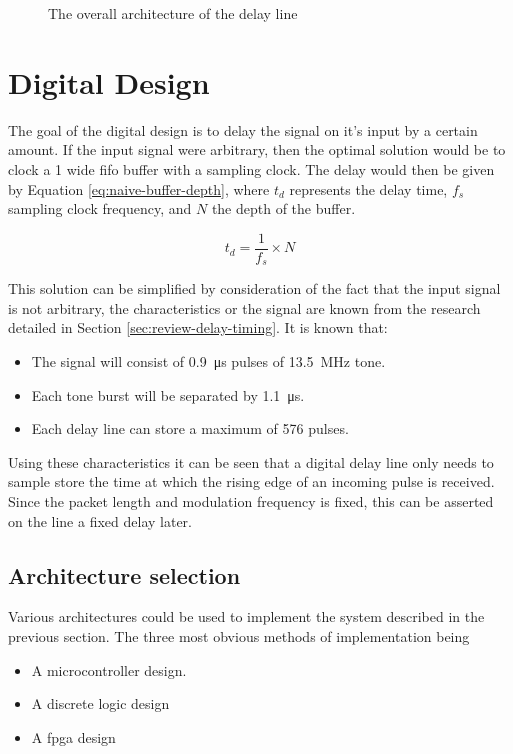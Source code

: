\begin{figure}[ht]
	\centering
	\dummyfigure
	\caption{The overall architecture of the delay line}
	\label{fig:delay-line-arch}
\end{figure}


\section{Digital Design} \label{sec:delay-line-dig-des}

The goal of the digital design is to delay the signal on it's input by a certain amount. If the input signal were arbitrary, then the optimal solution would be to clock a \SI{1}{\bit} wide \gls{fifo} buffer with a sampling clock. The delay would then be given by Equation \ref{eq:naive-buffer-depth}, where $t_d$ represents the delay time, $f_s$ sampling clock frequency, and $N$ the depth of the buffer.

\begin{equation}
	t_d = \frac{1}{f_s} \times N \label{eq:naive-buffer-depth}
\end{equation}

This solution can be simplified by consideration of the fact that the input signal is not arbitrary, the characteristics or the signal are known from the research detailed in Section \ref{sec:review-delay-timing}. It is known that:
\begin{itemize}
	\item The signal will consist of \SI{0.9}{\micro\second} pulses of \SI{13.5}{\mega\hertz} tone.
	\item Each tone burst will be separated by \SI{1.1}{\micro\second}.
	\item Each delay line can store a maximum of 576 pulses.
\end{itemize}

Using these characteristics it can be seen that a digital delay line only needs to sample store the time at which the rising edge of an incoming pulse is received. Since the packet length and modulation frequency is fixed, this can be asserted on the line a fixed delay later.

\subsection{Architecture selection}

Various architectures could be used to implement the system described in the previous section. The three most obvious methods of implementation being
\begin{itemize}
	\item A microcontroller design.
	\item A discrete logic design
	\item A \gls{fpga} design
\end{itemize}

